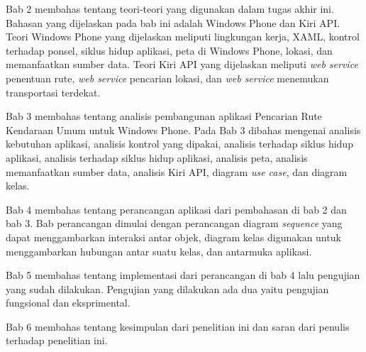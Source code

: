 Bab 2 membahas tentang teori-teori yang digunakan dalam tugas akhir ini. Bahasan yang dijelaskan pada bab ini adalah Windows Phone dan Kiri API. Teori Windows Phone yang dijelaskan meliputi lingkungan kerja, XAML, kontrol terhadap ponsel, siklus hidup aplikasi, peta di Windows Phone, lokasi, dan memanfaatkan sumber data. Teori Kiri API yang dijelaskan meliputi \textit{web service} penentuan rute, \textit{web service} pencarian lokasi, dan \textit{web service} menemukan transportasi terdekat. 

Bab 3 membahas tentang analisis pembangunan aplikasi Pencarian Rute Kendaraan Umum untuk Windows Phone. Pada Bab 3 dibahas mengenai analisis kebutuhan aplikasi, analisis kontrol yang dipakai, analisis terhadap siklus hidup aplikasi, analisis terhadap siklus hidup aplikasi, analisis peta, analisis memanfaatkan sumber data, analisis Kiri API, diagram \textit{use case}, dan diagram kelas.

Bab 4 membahas tentang perancangan aplikasi dari pembahasan di bab 2 dan bab 3. Bab perancangan dimulai dengan perancangan diagram \textit{sequence} yang dapat menggambarkan interaksi antar objek, diagram kelas digunakan untuk menggambarkan hubungan antar suatu kelas, dan antarmuka aplikasi.

Bab 5 membahas tentang implementasi  dari perancangan di bab 4 lalu pengujian yang sudah dilakukan. Pengujian yang dilakukan ada dua yaitu pengujian fungsional dan eksprimental. 

Bab 6 membahas tentang kesimpulan dari penelitian ini dan saran dari penulis terhadap penelitian ini.
